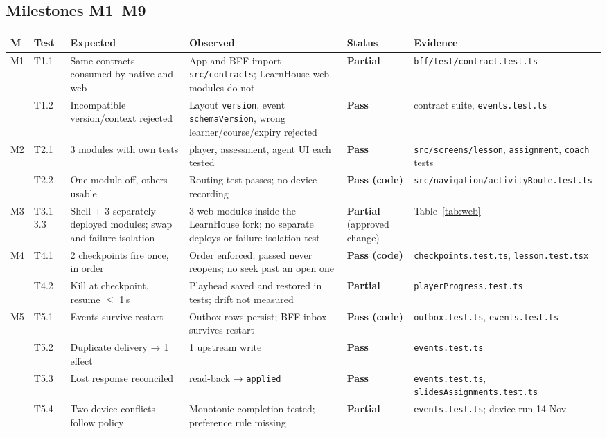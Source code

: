 \documentclass[11pt,a4paper]{article}
\newcommand{\pass}{\textcolor{okgreen}{\textbf{Pass}}}
\newcommand{\passcode}{\textcolor{okgreen}{\textbf{Pass (code)}}}
\newcommand{\partl}{\textcolor{partial}{\textbf{Partial}}}
\newcommand{\fp}[1]{\nolinkurl{#1}}
\begin{document}
\subsection{Milestones M1–M9}
\begin{xltabular}{\textwidth}{L{0.04\textwidth}L{0.07\textwidth}L{0.23\textwidth}L{0.25\textwidth}L{0.1\textwidth}Y}
\toprule
\textbf{M} & \textbf{Test} & \textbf{Expected} & \textbf{Observed} & \textbf{Status} & \textbf{Evidence} \\
\midrule
M1 & T1.1 & Same contracts consumed by native and web & App and BFF import \fp{src/contracts}; LearnHouse web modules do not & \partl & \fp{bff/test/contract.test.ts} \\
 & T1.2 & Incompatible version/context rejected & Layout \texttt{version}, event \texttt{schemaVersion}, wrong learner/course/expiry rejected & \pass & contract suite, \texttt{events.test.ts} \\
M2 & T2.1 & 3 modules with own tests & player, assessment, agent UI each tested & \pass & \fp{src/screens/lesson}, \fp{assignment}, \fp{coach} tests \\
 & T2.2 & One module off, others usable & Routing test passes; no device recording & \passcode & \fp{src/navigation/activityRoute.test.ts} \\
M3 & T3.1–3.3 & Shell + 3 separately deployed modules; swap and failure isolation & 3 web modules inside the LearnHouse fork; no separate deploys or failure-isolation test & \partl{} (approved change) & Table~\ref{tab:web} \\
M4 & T4.1 & 2 checkpoints fire once, in order & Order enforced; passed never reopens; no seek past an open one & \passcode & \fp{checkpoints.test.ts}, \fp{lesson.test.tsx} \\
 & T4.2 & Kill at checkpoint, resume $\le$ 1\,s & Playhead saved and restored in tests; drift not measured & \partl & \fp{playerProgress.test.ts} \\
M5 & T5.1 & Events survive restart & Outbox rows persist; BFF inbox survives restart & \passcode & \fp{outbox.test.ts}, \texttt{events.test.ts} \\
 & T5.2 & Duplicate delivery → 1 effect & 1 upstream write & \pass & \texttt{events.test.ts} \\
 & T5.3 & Lost response reconciled & read-back → \texttt{applied} & \pass & \texttt{events.test.ts}, \fp{slidesAssignments.test.ts} \\
 & T5.4 & Two-device conflicts follow policy & Monotonic completion tested; preference rule missing & \partl & \texttt{events.test.ts}; device run 14 Nov \\

\end{xltabular}
\end{document}
